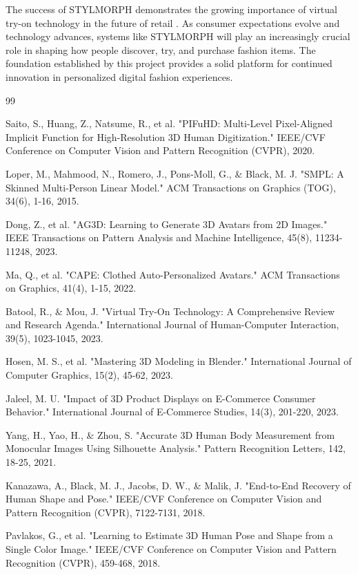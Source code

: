 \documentclass[12pt,a4paper,oneside]{report}
\begin{document}
The success of STYLMORPH demonstrates the growing importance of virtual try-on technology in the future of retail \cite{5, 7}. As consumer expectations evolve and technology advances, systems like STYLMORPH will play an increasingly crucial role in shaping how people discover, try, and purchase fashion items. The foundation established by this project provides a solid platform for continued innovation in personalized digital fashion experiences.

\begin{thebibliography}{99}

 Saito, S., Huang, Z., Natsume, R., et al. "PIFuHD: Multi-Level Pixel-Aligned Implicit Function for High-Resolution 3D Human Digitization." IEEE/CVF Conference on Computer Vision and Pattern Recognition (CVPR), 2020.

 Loper, M., Mahmood, N., Romero, J., Pons-Moll, G., \& Black, M. J. "SMPL: A Skinned Multi-Person Linear Model." ACM Transactions on Graphics (TOG), 34(6), 1-16, 2015.

 Dong, Z., et al. "AG3D: Learning to Generate 3D Avatars from 2D Images." IEEE Transactions on Pattern Analysis and Machine Intelligence, 45(8), 11234-11248, 2023.

 Ma, Q., et al. "CAPE: Clothed Auto-Personalized Avatars." ACM Transactions on Graphics, 41(4), 1-15, 2022.

 Batool, R., \& Mou, J. "Virtual Try-On Technology: A Comprehensive Review and Research Agenda." International Journal of Human-Computer Interaction, 39(5), 1023-1045, 2023.

 Hosen, M. S., et al. "Mastering 3D Modeling in Blender." International Journal of Computer Graphics, 15(2), 45-62, 2023.

 Jaleel, M. U. "Impact of 3D Product Displays on E-Commerce Consumer Behavior." International Journal of E-Commerce Studies, 14(3), 201-220, 2023.

 Yang, H., Yao, H., \& Zhou, S. "Accurate 3D Human Body Measurement from Monocular Images Using Silhouette Analysis." Pattern Recognition Letters, 142, 18-25, 2021.

 Kanazawa, A., Black, M. J., Jacobs, D. W., \& Malik, J. "End-to-End Recovery of Human Shape and Pose." IEEE/CVF Conference on Computer Vision and Pattern Recognition (CVPR), 7122-7131, 2018.

 Pavlakos, G., et al. "Learning to Estimate 3D Human Pose and Shape from a Single Color Image." IEEE/CVF Conference on Computer Vision and Pattern Recognition (CVPR), 459-468, 2018.


\end{thebibliography}
\end{document}
